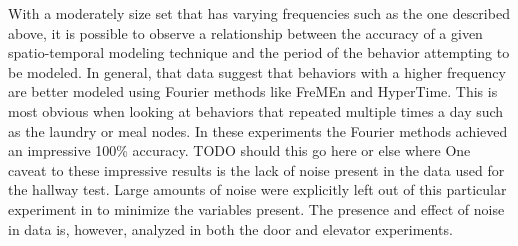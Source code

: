 With a moderately size set that has varying frequencies such as the one
described above, it is possible to observe a relationship between the accuracy
of a given spatio-temporal modeling technique and the period of the behavior
attempting to be modeled. In general, that data suggest that behaviors with
a higher frequency are better modeled using Fourier methods like FreMEn and
HyperTime. This is most obvious when looking at behaviors that repeated multiple
times a day such as the laundry or meal nodes. In these experiments the Fourier
methods achieved an impressive 100\% accuracy. TODO should this go here or
else where\?  One caveat to these impressive results is the lack of noise
present in the data used for the hallway test. Large amounts of noise were
explicitly left out of this particular experiment in to minimize the variables
present. The presence and effect of noise in data is, however, analyzed in
both the door and elevator experiments. \\

\begin{table}[h!]
  \centering
  \caption{Hallway Laundry Section}
\end{table}

\begin{table}[h!]
  \centering
  \caption{Hallway Meal Section 0}
\end{table}

